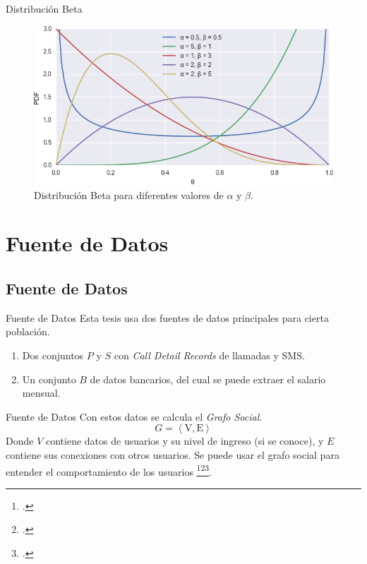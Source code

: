 \documentclass[usenames,dvipsnames,table]{beamer}
\begin{document}
\begin{frame}{Distribución Beta}
	
	\begin{figure}
		\includegraphics[width=\framewidth]{beta.png}
		\caption{Distribución Beta para diferentes valores de $\alpha$ y $\beta$.}
	\end{figure}
	
\end{frame}

\section{Fuente de Datos}

\subsection{Fuente de Datos}

\begin{frame}{Fuente de Datos}
	Esta tesis usa dos fuentes de datos principales para cierta población.
	\begin{enumerate}
		\item Dos conjuntos $P$ y $S$ con \emph{Call Detail Records} de llamadas y SMS\@.
		\item Un conjunto $B$ de datos bancarios, del cual se puede extraer el salario mensual.
	\end{enumerate}
\end{frame}

\begin{frame}{Fuente de Datos}
	Con estos datos se calcula el \emph{Grafo Social}.
	\begin{equation*}
		G = \left< \text{V}, \text{E} \right>
	\end{equation*}
	Donde $V$ contiene datos de usuarios y su nivel de ingreso (si se conoce), y $E$ contiene sus conexiones con otros usuarios. Se puede usar el grafo social para entender el comportamiento de los usuarios \footcite{gonzalez2008understanding}\footcite{ponieman2013human}\footcite{sarraute2015city}.

	\begin{center}
		
	\end{center}
\end{frame}
\end{document}
